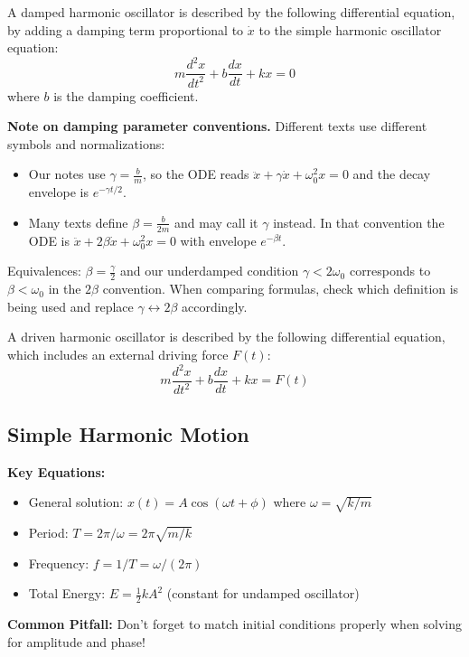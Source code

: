 \documentclass[11pt]{report}
\begin{document}
\begin{definition}
    A damped harmonic oscillator is described by the following differential equation, by adding a damping term proportional to $\dot{x}$ to the simple harmonic oscillator equation:
    \begin{equation} \label{eq:damped_ho}
        m \frac{d^2 x}{dt^2} + b \frac{dx}{dt} + kx = 0   
    \end{equation}
    where \( b \) is the damping coefficient.
\end{definition}

\begin{shaded}
	\textbf{Note on damping parameter conventions.} Different texts use different symbols and normalizations:
\begin{itemize}
    \item Our notes use $\gamma = \tfrac{b}{m}$, so the ODE reads $\ddot{x} + \gamma\dot{x} + \omega_0^2 x = 0$ and the decay envelope is $e^{-\gamma t/2}$.
    \item Many texts define $\beta = \tfrac{b}{2m}$ and may call it $\gamma$ instead. In that convention the ODE is $\ddot{x} + 2\beta\dot{x} + \omega_0^2 x = 0$ with envelope $e^{-\beta t}$.
\end{itemize}
Equivalences: $\beta = \tfrac{\gamma}{2}$ and our underdamped condition $\gamma < 2\omega_0$ corresponds to $\beta < \omega_0$ in the $2\beta$ convention. When comparing formulas, check which definition is being used and replace $\gamma \leftrightarrow 2\beta$ accordingly.
\end{shaded}

\begin{definition}
    A driven harmonic oscillator is described by the following differential equation, which includes an external driving force $F(t)$:
    $$
        m \frac{d^2 x}{dt^2} + b \frac{dx}{dt} + kx = F(t)   
    $$
\end{definition}

\subsection{Simple Harmonic Motion}

\begin{keybox}
\textbf{Key Equations:}
\begin{itemize}
    \item General solution: $x(t) = A\cos(\omega t + \phi)$ where $\omega = \sqrt{k/m}$
    \item Period: $T = 2\pi/\omega = 2\pi\sqrt{m/k}$
    \item Frequency: $f = 1/T = \omega/(2\pi)$
    \item Total Energy: $E = \frac{1}{2}kA^2$ (constant for undamped oscillator)
\end{itemize}
\textbf{Common Pitfall:} Don't forget to match initial conditions properly when solving for amplitude and phase!
\end{keybox}
\end{document}
